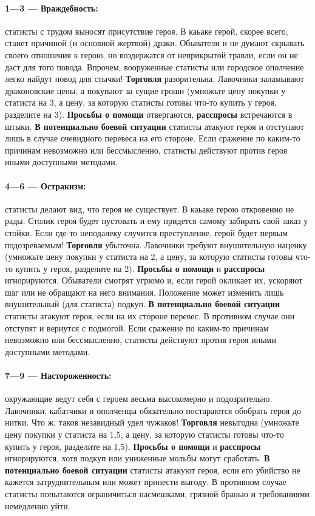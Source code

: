 \paragraph{1—3 — Враждебность:} статисты с трудом выносят присутствие героя. В каьаке герой, скорее всего, станет причиной (и основной жертвой) драки. Обыватели и не думают скрывать своего отношения к герою, но воздержатся от неприкрытой травли, если он не даст для того повода. Впрочем, вооруженные статисты или городское ополчение легко найдут повод для стычки!
\newline
\textbf{Торговля} разорительна. Лавочники заламывают драконовские цены, а покупают за сущие гроши (умножьте цену покупки у статиста на 3, а цену, за которую статисты готовы что-то купить у героя, разделите на 3).
\newline
\textbf{Просьбы о помощи} отвергаются, \textbf{расспросы} встречаются в штыки.
\newline
\textbf{В потенциально боевой ситуации} статисты атакуют героя и отступают лишь в случае очевидного перевеса на его стороне. Если сражение по каким-то причинам невозможно или бессмысленно, статисты действуют против героя иными доступными методами.
\paragraph{4—6 — Остракизм:} статисты делают вид, что героя не существует. В каьаке герою откровенно не рады. Столик героя будет пустовать и ему придется самому забирать свой заказ у стойки. Если где-то неподалеку случится преступление, герой будет первым подозреваемым!
\newline
\textbf{Торговля} убыточна. Лавочники требуют внушительную наценку (умножьте цену покупки у статиста на 2, а цену, за которую статисты готовы что-то купить у героя, разделите на 2).
\newline
\textbf{Просьбы о помощи} и \textbf{расспросы} игнорируются. Обыватели смотрят угрюмо и, если герой окликает их, ускоряют шаг или не обращают на него внимания. Положение может изменить лишь внушительный (для статиста) подкуп.
\newline
\textbf{В потенциально боевой ситуации} статисты атакуют героя, если на их стороне перевес. В противном случае они отступят и вернутся с подмогой. Если сражение по каким-то причинам невозможно или бессмысленно, статисты действуют против героя иными доступными методами.
\paragraph{7—9 — Настороженность:} окружающие ведут себя с героем весьма высокомерно и подозрительно. Лавочники, кабатчики и ополченцы обязательно постараются обобрать героя до нитки. Что ж, таков незавидный удел чужаков!
\textbf{Торговля} невыгодна (умножьте цену покупки у статиста на 1,5, а цену, за которую статисты готовы что-то купить у героя, разделите на 1,5).
\textbf{Просьбы о помощи} и \textbf{расспросы} игнорируются, хотя подкуп или униженные мольбы могут сработать.
\textbf{В потенциально боевой ситуации} статисты атакуют героя, если его убийство не кажется затруднительным или может принести выгоду. В противном случае статисты попытаются ограничиться насмешками, грязной бранью и требованиями немедленно уйти.
